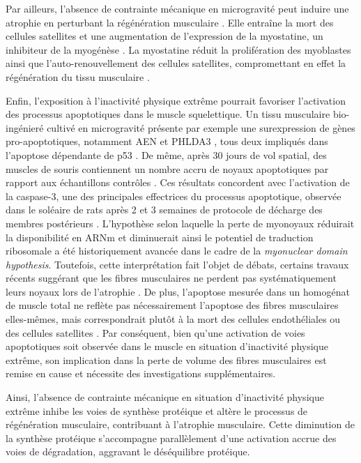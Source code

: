 \documentclass[11pt]{report}
\begin{document}
Par ailleurs, l'absence de contrainte mécanique en microgravité peut induire une atrophie en perturbant la régénération musculaire \parencite{Komarova2022Aug}. Elle entraîne la mort des cellules satellites et une augmentation de l'expression de la myostatine, un inhibiteur de la myogénèse \parencite{Tarantino2020Aug}. La myostatine réduit la prolifération des myoblastes ainsi que l'auto-renouvellement des cellules satellites, compromettant en effet la régénération du tissu musculaire \parencite{Thomas2000Dec}.

Enfin, l'exposition à l'inactivité physique extrême pourrait favoriser l'activation des processus apoptotiques dans le muscle squelettique. Un tissu musculaire bio-ingénieré cultivé en microgravité présente par exemple une surexpression de gènes pro-apoptotiques, notamment AEN et PHLDA3 \parencite{Kim2024Aug}, tous deux impliqués dans l'apoptose dépendante de p53 \parencite{Kawase2008Jun,Kawase2009Feb}. De même, après 30 jours de vol spatial, des muscles de souris contiennent un nombre accru de noyaux apoptotiques par rapport aux échantillons contrôles \parencite{Radugina2018Feb}. Ces résultats concordent avec l'activation de la caspase-3, une des principales effectrices du processus apoptotique, observée dans le soléaire de rats après 2 et 3 semaines de protocole de décharge des membres postérieurs \parencite{Leeuwenburgh2005May,Nagano2008}. L'hypothèse selon laquelle la perte de myonoyaux réduirait la disponibilité en ARNm et diminuerait ainsi le potentiel de traduction ribosomale a été historiquement avancée dans le cadre de la \textit{myonuclear domain hypothesis}. Toutefois, cette interprétation fait l'objet de débats, certains travaux récents suggérant que les fibres musculaires ne perdent pas systématiquement leurs noyaux lors de l'atrophie \parencite{Gundersen2008Jun,Schwartz2019Jan}. De plus, l'apoptose mesurée dans un homogénat de muscle total ne reflète pas nécessairement l'apoptose des fibres musculaires elles-mêmes, mais correspondrait plutôt à la mort des cellules endothéliales ou des cellules satellites \parencite{Gundersen2008Jun,Schwartz2019Jan}. Par conséquent, bien qu'une activation de voies apoptotiques soit observée dans le muscle en situation d'inactivité physique extrême, son implication dans la perte de volume des fibres musculaires est remise en cause et nécessite des investigations supplémentaires.

Ainsi, l'absence de contrainte mécanique en situation d'inactivité physique extrême inhibe les voies de synthèse protéique et altère le processus de régénération musculaire, contribuant à l'atrophie musculaire. Cette diminution de la synthèse protéique s'accompagne parallèlement d'une activation accrue des voies de dégradation, aggravant le déséquilibre protéique.
\end{document}

